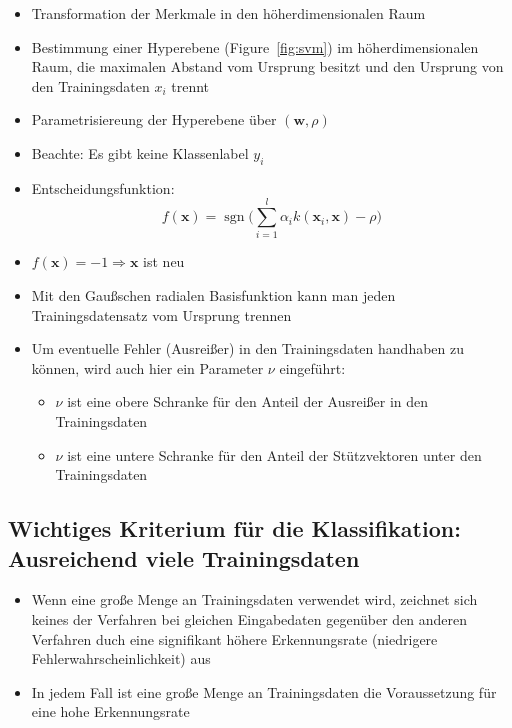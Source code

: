 \documentclass[11pt]{article}
\DeclareMathOperator{\sgn}{sgn} %
\begin{document}
\begin{itemize}
\begin{itemize}
            \item Transformation der Merkmale in den höherdimensionalen Raum
            \item Bestimmung einer Hyperebene (Figure~\ref{fig:svm}) im höherdimensionalen Raum, die maximalen Abstand vom Ursprung besitzt und den Ursprung von den Trainingsdaten $x_i$ trennt
            \item Parametrisiereung der Hyperebene über $(\boldsymbol{w}, \rho)$
            \item Beachte: Es gibt keine Klassenlabel $y_i$
            \item Entscheidungsfunktion: $$f(\boldsymbol{x}) = \sgn \bigg(\sum_{i=1}^l \alpha_i k(\boldsymbol{x}_i, \boldsymbol{x}) - \rho \bigg)$$
            \item $f(\boldsymbol{x}) = -1 \Rightarrow \boldsymbol{x}$ ist neu
            \item Mit den Gaußschen radialen Basisfunktion kann man jeden Trainingsdatensatz vom Ursprung trennen
            \item Um eventuelle Fehler (Ausreißer) in den Trainingsdaten handhaben zu können, wird auch hier ein Parameter $\nu$ eingeführt:
                \begin{itemize}
                    \item $\nu$ ist eine obere Schranke für den Anteil der Ausreißer in den Trainingsdaten
                    \item $\nu$ ist eine untere Schranke für den Anteil der Stützvektoren unter den Trainingsdaten
                \end{itemize}
        \end{itemize}
\end{itemize}


\subsection{Wichtiges Kriterium für die Klassifikation: Ausreichend viele Trainingsdaten}

\begin{itemize}
    \item Wenn eine große Menge an Trainingsdaten verwendet wird, zeichnet sich keines der Verfahren bei gleichen Eingabedaten gegenüber den anderen Verfahren duch eine signifikant höhere Erkennungsrate (niedrigere Fehlerwahrscheinlichkeit) aus
    \item In jedem Fall ist eine große Menge an Trainingsdaten die Voraussetzung für eine hohe Erkennungsrate
\end{itemize}
\end{document}
